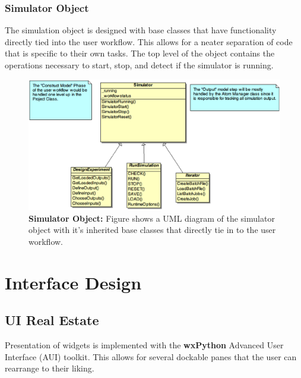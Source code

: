 \documentclass[12pt]{article}
\begin{document}
\subsubsection*{Simulator Object}

	The simulation object is designed with base classes that have functionality directly tied into the user workflow. This allows for a neater separation of code that is specific to their own tasks. The top level of the object contains the operations necessary to start, stop, and detect if the simulator is running. 

\begin{figure}[ht]
   \centering
   \includegraphics[scale=0.6]{figures/SimulatorObject.eps}
   \caption{{\bf Simulator Object:} Figure shows a UML diagram of the simulator object with it's inherited base classes that directly tie in to the user workflow.}
   \label{fig:Simulator Object}
\end{figure}


\section*{Interface Design}

\subsection*{UI Real Estate}

Presentation of widgets is implemented with the {\bf wxPython} Advanced User Interface (AUI) toolkit. This allows for several dockable panes that the user can rearrange to their liking. 
\end{document}
